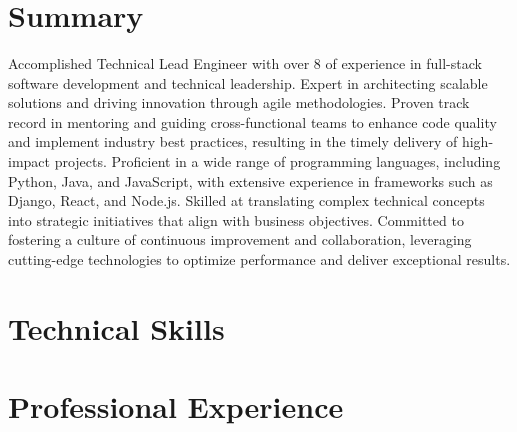 \documentclass[11pt,a4paper,sans]{moderncv}
\title{\textnormal{\textls[150]{TECHLEAD ENGINEER}}} %
\begin{document}
\makecvtitle

\section{Summary}
Accomplished Technical Lead Engineer with over 8 of experience in full-stack software development and technical leadership. 
Expert in architecting scalable solutions and driving innovation through agile methodologies. Proven track record in mentoring and 
guiding cross-functional teams to enhance code quality and implement industry best practices, resulting in the timely delivery of 
high-impact projects. Proficient in a wide range of programming languages, including Python, Java, and JavaScript, with extensive 
experience in frameworks such as Django, React, and Node.js. Skilled at translating complex technical concepts into strategic 
initiatives that align with business objectives. Committed to fostering a culture of continuous improvement and collaboration, 
leveraging cutting-edge technologies to optimize performance and deliver exceptional results.
\section{Technical Skills}

\section{Professional Experience}


\end{document}
